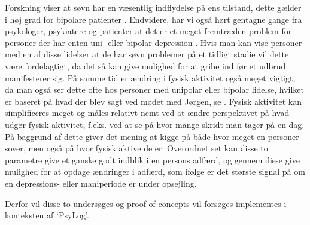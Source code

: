 Forskning viser at søvn har en væsentlig indflydelse på ens tilstand, dette gælder i høj grad for bipolare patienter \citep{CPSP:CPSP1164}.
Endvidere, har vi også hørt gentagne gange fra psykologer, psykiatere og patienter at det er et meget fremtræden problem for personer der har enten uni- eller bipolar depression \citep[Kapitel 2, Sektion 3,4,5]{misc:faellesrapp}.
Hvis man kan vise personer med en af disse lidelser at de har søvn problemer på et tidligt stadie vil dette være fordelagtigt, da det så kan give mulighed for at gribe ind før et udbrud manifesterer sig.
På samme tid er ændring i fysisk aktivitet også meget vigtigt, da man også ser dette ofte hos personer med unipolar eller bipolar lidelse, hvilket er baseret på hvad der blev sagt ved mødet med Jørgen, se \citep[Kapitel 1, Sektion 4]{misc:faellesrapp}. 
Fysisk aktivitet kan simplificeres meget og måles relativt nemt ved at ændre perspektivet på hvad udgør fysisk aktivitet, f.eks. ved at se på hvor mange skridt man tager på en dag.
På baggrund af dette giver det mening at kigge på både hvor meget en personer sover, men også på hvor fysisk aktive de er.
Overordnet set kan disse to parametre give et ganske godt indblik i en persons adfærd, og gennem disse give mulighed for at opdage ændringer i adfærd, som ifølge \citet{misc:jorgen-aagaard} er det største signal på om en depressions- eller maniperiode er under opsejling. 

Derfor vil disse to undersøges og proof of concepts vil forsøges implementes i konteksten af `PsyLog'.
